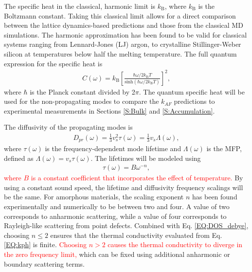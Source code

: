 \documentclass[aps,prb,twocolumn,superscriptaddress,footinbib,amsmath,amssymb,floatfix]{revtex4}
\begin{document}
The specific heat in the classical, harmonic limit is 
$k_{\text{B}}$, where $k_{\text{B}}$ is the Boltzmann constant. 
Taking this classical limit allows for a direct 
comparison between the lattice dynamics-based 
predictions and those from the classical MD simulations. 
The harmonic approximation has been found to be valid 
for classical systems ranging from 
Lennard-Jones (LJ) argon,\cite{mcgaughey_quantitative_2004} 
to crystalline Stillinger-Weber silicon\cite{larkin_comparison_2012} 
at temperatures below half the melting temperature. 
The full quantum expression for the specific heat is
\cite{ziman_electrons_2001}
\begin{equation}\label{EQ:Cquantum}
\begin{split}
C(\omega) = k_{\text{B}}\left[\frac{\hbar\omega/2k_{\text{B}}T}
{\text{sinh}(\hbar\omega/2k_{\text{B}}T)}\right]^2,
\end{split}
\end{equation} 
where $\hbar$ is the Planck constant divided by 2$\pi$. 
The quantum specific heat will be used 
for the non-propagating modes to compare the $k_{AF}$ predictions 
to experimental measurements in Sections \ref{S:Bulk} 
and \ref{S:Accumulation}. 

The diffusivity of the propagating modes is    
\begin{equation}\label{EQ:Dtau}
\begin{split}
D_{pr}(\omega) = \frac{1}{3}v^2_s\tau(\omega) = \frac{1}{3}v_s \Lambda(\omega),
\end{split}
\end{equation}
where $\tau(\omega)$ is the frequency-dependent mode 
lifetime and $\Lambda(\omega)$ is the MFP, 
defined as $\Lambda(\omega) = v_{s} \tau(\omega)$. 
The lifetimes will be modeled using 
\begin{equation}\label{EQ:tauw2}
\begin{split}
\tau(\omega) = B \omega^{-n},
\end{split}
\end{equation}
\textcolor{red}{where $B$ is a constant coefficient that incorporates 
the effect of temperature.} 
By using a constant sound speed, the lifetime and diffusivity 
frequency scalings will be the same. 
For amorphous materials, the scaling exponent $n$ 
has been found experimentally and numerically to be 
between two and four.
\cite{feldman_numerical_1999,horbach_high_2001,
feldman_calculations_2002,masciovecchio_evidence_2006,
christie_vibrational_2007,liu_high_2009,
baldi_sound_2010,yang_anomalously_2010,baldi_elastic_2011,
he_heat_2011,baldi_emergence_2013}
A value of two corresponds to 
anharmonic scattering,\cite{callaway_model_1959} while a value of four 
corresponds to Rayleigh-like scattering from point defects.
\cite{klemens_scattering_1955}
Combined with Eq. \eqref{EQ:DOS_debye}, choosing $n\le2$ ensures 
that the thermal conductivity evaluated from Eq. \eqref{EQ:kph} is finite. 
\textcolor{red}{Choosing $n>2$ causes the thermal conductivity to diverge 
in the zero frequency limit,}   
which can be fixed using additional anharmonic
\cite{feldman_thermal_1993,feldman_numerical_1999} 
or boundary scattering terms.
\cite{cahill_thermal_1994,liu_high_2009,yang_anomalously_2010}
\end{document}
